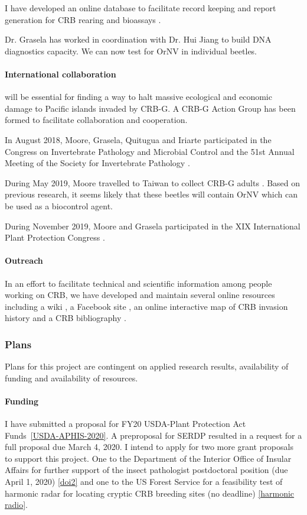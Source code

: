 \begin{refsection}
I have developed an online database to facilitate record keeping and report generation for CRB rearing and bioassays \cite{moore_coconut_2019-1}. 

Dr. Grasela has worked in coordination with Dr. Hui Jiang to build DNA diagnostics capacity. We can now test for OrNV in individual beetles.

\paragraph{International collaboration} will be essential for finding a way to halt massive ecological and economic damage to Pacific islands invaded by CRB-G. A CRB-G Action Group has been formed to facilitate collaboration and cooperation.

In August 2018, Moore, Grasela, Quitugua and Iriarte participated in the Congress on Invertebrate Pathology and Microbial Control and the 51st Annual Meeting of the Society for Invertebrate Pathology \cite{moore_trip_2018-1,moore_attempted_2018,marshall_progress_2018}.

During May 2019, Moore travelled to Taiwan to collect CRB-G adults \cite{moore_taipei_2019}. Based on previous research, it seems likely that these beetles will contain OrNV which can be used as a biocontrol agent.

During November 2019, Moore and Grasela participated in the XIX International Plant Protection Congress \cite{moore_india_2019,moore_status_2019,marshall_challenge_2019}.

\paragraph{Outreach} In an effort to facilitate technical and scientific information among people working on CRB, we have developed and maintain several online resources including a wiki \cite{moore_crb-g_2019}, a Facebook site \cite{moore_facebook_2019}, an online interactive map of CRB invasion history \cite{moore_online_2019} and a CRB bibliography \cite{moore_coconut_2019}.

\subsubsection{Plans}

Plans for this project are contingent on applied research results, availability of funding and availability of resources.

\paragraph{Funding} I have submitted a proposal for FY20 USDA-Plant Protection Act Funds~\ref{USDA-APHIS-2020}. A preproposal for 
SERDP resulted in a request for a full proposal due March 4, 2020.  I intend to apply for two more grant proposals to support this project. One to the Department of the Interior Office of Insular Affairs for further support of the insect pathologist postdoctoral position (due April 1, 2020) \ref{doi2} and one to the US Forest Service for a feasibility test of harmonic radar for locating cryptic CRB breeding sites (no deadline) \ref{harmonic radio}.


\end{refsection}
